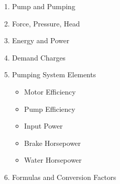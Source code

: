 \documentclass{article}
\begin{document}
\begin{enumerate}
\vspace{0.1cm}
\item Pump and Pumping
\vspace{0.1cm}
\item Force, Pressure, Head
\vspace{0.1cm}
\item Energy and Power
\vspace{0.1cm}
\item Demand Charges
\vspace{0.1cm}
\item Pumping System Elements
\begin{itemize}
\item Motor Efficiency
\vspace{0.1cm}
\item Pump Efficiency
\vspace{0.1cm}
\item Input Power
\vspace{0.1cm}
\item Brake Horsepower
\vspace{0.1cm}
\item Water Horsepower
\end{itemize}
\item Formulas and Conversion Factors
\end{enumerate}
\end{document}
